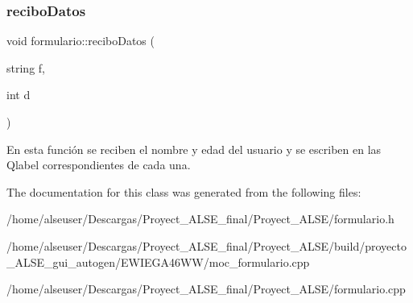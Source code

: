 \subsubsection{\texorpdfstring{recibo\+Datos}{reciboDatos}}
{\footnotesize\ttfamily void formulario\+::recibo\+Datos (\begin{DoxyParamCaption}\item[{string}]{f,  }\item[{int}]{d }\end{DoxyParamCaption})\hspace{0.3cm}{\ttfamily [slot]}}

En esta función se reciben el nombre y edad del usuario y se escriben en las Qlabel correspondientes de cada una. 

The documentation for this class was generated from the following files\+:\begin{DoxyCompactItemize}
\item 
/home/alseuser/\+Descargas/\+Proyect\+\_\+\+A\+L\+S\+E\+\_\+final/\+Proyect\+\_\+\+A\+L\+S\+E/formulario.\+h\item 
/home/alseuser/\+Descargas/\+Proyect\+\_\+\+A\+L\+S\+E\+\_\+final/\+Proyect\+\_\+\+A\+L\+S\+E/build/proyecto\+\_\+\+A\+L\+S\+E\+\_\+gui\+\_\+autogen/\+E\+W\+I\+E\+G\+A46\+W\+W/moc\+\_\+formulario.\+cpp\item 
/home/alseuser/\+Descargas/\+Proyect\+\_\+\+A\+L\+S\+E\+\_\+final/\+Proyect\+\_\+\+A\+L\+S\+E/formulario.\+cpp\end{DoxyCompactItemize}
